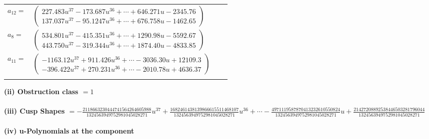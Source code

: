 \documentclass[1p]{elsarticle_modified}
\theoremstyle{definition}
\begin{document}
\begin{tabular}{m{7pt} m{180pt} m{7pt} m{180pt} }
\flushright $a_{12}=$&$\begin{pmatrix}227.483 u^{37}-173.687 u^{36}+\cdots+646.271 u-2345.76\\137.037 u^{37}-95.1247 u^{36}+\cdots+676.758 u-1462.65\end{pmatrix}$ \\
\flushright $a_{8}=$&$\begin{pmatrix}534.801 u^{37}-415.351 u^{36}+\cdots+1290.98 u-5592.67\\443.750 u^{37}-319.344 u^{36}+\cdots+1874.40 u-4833.85\end{pmatrix}$ \\
\flushright $a_{11}=$&$\begin{pmatrix}-1163.12 u^{37}+911.426 u^{36}+\cdots-3036.30 u+12109.3\\-396.422 u^{37}+270.231 u^{36}+\cdots-2010.78 u+4636.37\end{pmatrix}$\\&\end{tabular}
\flushleft \textbf{(ii) Obstruction class $= 1$}\\~\\
\flushleft \textbf{(iii) Cusp Shapes $= -\frac{2118663230444741564264605988}{1324563949752981045028271} u^{37}+\frac{1682461438139866615511468107}{1324563949752981045028271} u^{36}+\cdots-\frac{4971119587870413232610550824}{1324563949752981045028271} u+\frac{21427208892538446503281796044}{1324563949752981045028271}$}\\~\\
\newpage\renewcommand{\arraystretch}{1}
\flushleft \textbf{(iv) u-Polynomials at the component}\newline \\
\end{document}
